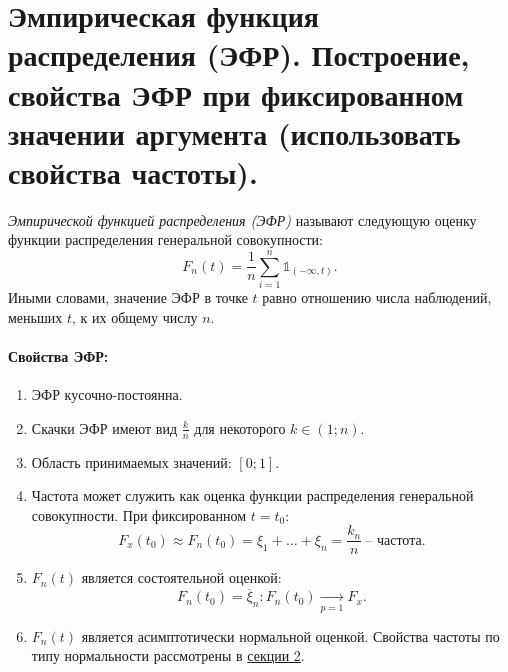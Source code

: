 \section{Эмпирическая функция распределения (ЭФР). Построение, свойства ЭФР при
фиксированном значении аргумента (использовать свойства частоты).}

\begin{definition}
    \textit{Эмпирической функцией распределения (ЭФР)} называют следующую оценку
    функции распределения генеральной совокупности:
    \[
        F_n(t) = \frac{1}{n} \sum_{i = 1}^{n} \mathbb{1}_{(-\infty, t)}
    .\]
    Иными словами, значение ЭФР в точке $t$ равно отношению числа наблюдений,
    меньших $t$, к их общему числу $n$.
\end{definition}

\paragraph{Свойства ЭФР:}

\begin{enumerate}
    \item ЭФР кусочно-постоянна.
    \item Скачки ЭФР имеют вид $\frac{k}{n}$ для некоторого $k \in (1; n)$.
    \item Область принимаемых значений: $[0; 1]$.
    \item Частота может служить как оценка функции распределения генеральной
        совокупности. При фиксированном $t = t_0$:
        \[
            F_x(t_0) \approx F_n(t_0) = \xi_1 + \ldots + \xi_n =
            \frac{k_n}{n}~ \text{-- частота}
        .\]
    \item $F_n(t)$ является состоятельной оценкой:
        \[
            F_n(t_0) = \overline{\xi}_n: F_n(t_0) \xrightarrow[p = 1]{} F_x
        .\]
    \item $F_n(t)$ является асимптотически нормальной оценкой. Свойства частоты
    по типу нормальности рассмотрены в \hyperref[sec:normfreq]{секции 2}.
\end{enumerate}
